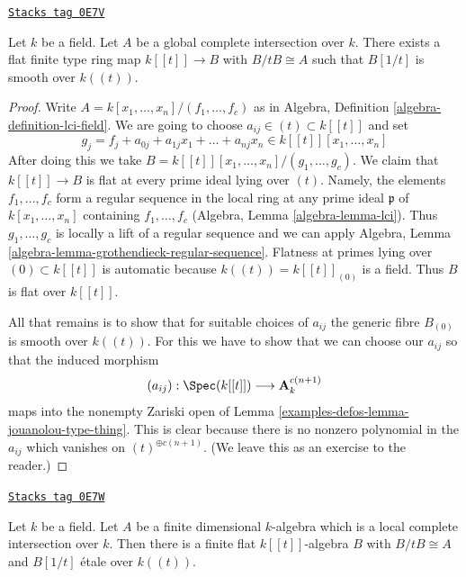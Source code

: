 \begin{lemma}
\label{examples-defos-lemma-smoothing-affine-lci}
\href{https://stacks.math.columbia.edu/tag/0E7V}{\texttt{Stacks tag 0E7V}}

Let $k$ be a field. Let $A$ be a global complete intersection
over $k$. There exists a flat finite type ring map
$k[[t]] \to B$ with $B/tB \cong A$ such that
$B[1/t]$ is smooth over $k((t))$.
\end{lemma}

\begin{proof}
Write $A = k[x_1, \ldots, x_n]/(f_1, \ldots, f_c)$ as in
Algebra, Definition \ref{algebra-definition-lci-field}.
We are going to choose
$a_{ij} \in (t) \subset k[[t]]$ and set
$$
g_j = f_j + a_{0j} + a_{1j}x_1 + \ldots + a_{nj}x_n \in
k[[t]][x_1, \ldots, x_n]
$$
After doing this we take
$B = k[[t]][x_1, \ldots, x_n]/(g_1, \ldots, g_c)$.
We claim that $k[[t]] \to B$ is flat at every prime ideal
lying over $(t)$. Namely, the elements $f_1, \ldots, f_c$
form a regular sequence in the local ring at any prime ideal
$\mathfrak p$ of $k[x_1, \ldots, x_n]$ containing $f_1, \ldots, f_c$
(Algebra, Lemma \ref{algebra-lemma-lci}). Thus $g_1, \ldots, g_c$
is locally a lift of a regular sequence and we can apply
Algebra, Lemma \ref{algebra-lemma-grothendieck-regular-sequence}.
Flatness at primes lying over $(0) \subset k[[t]]$ is automatic
because $k((t)) = k[[t]]_{(0)}$ is a field. Thus $B$ is flat
over $k[[t]]$.

\medskip\noindent
All that remains is to show that for suitable choices
of $a_{ij}$ the generic fibre $B_{(0)}$ is smooth over
$k((t))$. For this we have to show that we can choose
our $a_{ij}$ so that the induced morphism
$$
(a_{ij}) : \Spec(k[[t]]) \longrightarrow \mathbf{A}^{c(n + 1)}_k
$$
maps into the nonempty Zariski open of
Lemma \ref{examples-defos-lemma-jouanolou-type-thing}.
This is clear because there is no nonzero polynomial in the
$a_{ij}$ which vanishes on $(t)^{\oplus c(n + 1)}$.
(We leave this as an exercise to the reader.)
\end{proof}

\begin{lemma}
\label{examples-defos-lemma-smoothing-artinian-lci}
\href{https://stacks.math.columbia.edu/tag/0E7W}{\texttt{Stacks tag 0E7W}}

Let $k$ be a field. Let $A$ be a finite dimensional $k$-algebra
which is a local complete intersection over $k$. Then there is
a finite flat $k[[t]]$-algebra $B$ with $B/tB \cong A$
and $B[1/t]$ \'etale over $k((t))$.
\end{lemma}

